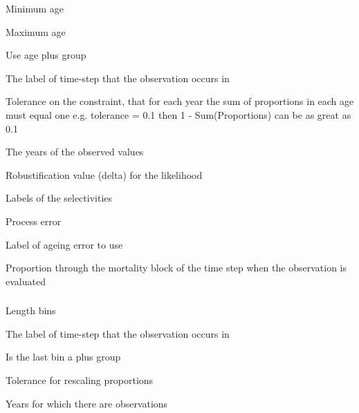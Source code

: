  {Minimum age}

 {Maximum age}

 {Use age plus group}

 {The label of time-step that the observation occurs in}

 {Tolerance on the constraint, that for each year the sum of proportions in each age must equal one e.g. tolerance = 0.1 then 1 - Sum(Proportions) can be as great as 0.1}

 {The years of the observed values}

 {Robustification value (delta) for the likelihood}

 {Labels of the selectivities}

 {Process error}

 {Label of ageing error to use}

 {Proportion through the mortality block of the time step when the observation is evaluated}

\subsubsection[Process Proportions At Length]{}

 {Length bins}

 {The label of time-step that the observation occurs in}

 {Is the last bin a plus group}

 {Tolerance for rescaling proportions}

 {Years for which there are observations}

